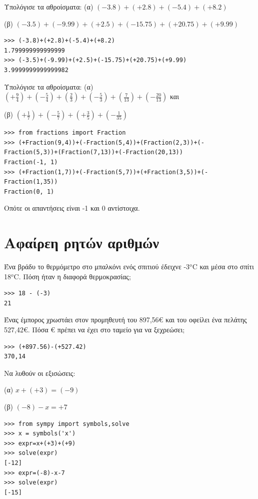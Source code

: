 \begin{exercise}  Υπολόγισε τα αθροίσματα:
(α) $(-3.8)+(+2.8)+(-5.4)+(+8.2)$

(β) $(-3.5)+(-9.99)+(+2.5)+(-15.75)+(+20.75)+(+9.99)$

\end{exercise}
\begin{lstlisting}
>>> (-3.8)+(+2.8)+(-5.4)+(+8.2)
1.799999999999999
>>> (-3.5)+(-9.99)+(+2.5)+(-15.75)+(+20.75)+(+9.99)
3.9999999999999982
\end{lstlisting}

\begin{exercise}
Υπολόγισε τα αθροίσματα:
(α) $\left(+\frac{9}{4}\right)+\left(-\frac{5}{4}\right)+\left(\frac{2}{3}\right)+\left(-\frac{5}{3}\right)+\left(\frac{7}{13}\right)+\left(-\frac{20}{13}\right)$ και 

(β) $\left(+\frac{1}{7}\right)+\left(-\frac{5}{7}\right)+\left(+\frac{3}{5}\right)+\left(-\frac{1}{35}\right)$
\end{exercise}
\begin{lstlisting}
>>> from fractions import Fraction
>>> (+Fraction(9,4))+(-Fraction(5,4))+(Fraction(2,3))+(-Fraction(5,3))+(Fraction(7,13))+(-Fraction(20,13))
Fraction(-1, 1)
>>> (+Fraction(1,7))+(-Fraction(5,7))+(+Fraction(3,5))+(-Fraction(1,35))
Fraction(0, 1)
\end{lstlisting}
Οπότε οι απαντήσεις είναι -1 και 0 αντίστοιχα.
\section{Αφαίρεη ρητών αριθμών}
\begin{exercise}
 Ένα βράδυ το θερμόμετρο στο μπαλκόνι ενός σπιτιού έδειχνε -3$^o$C και μέσα στο σπίτι 18$^o$C. Πόση ήταν η διαφορά θερμοκρασίας;
\end{exercise}
\begin{lstlisting}
>>> 18 - (-3)
21
\end{lstlisting}
\begin{exercise}
Ένας έμπορος χρωστάει στον προμηθευτή του 897,56€ και του οφείλει ένα πελάτης 527,42€. Πόσα € πρέπει να έχει στο ταμείο για να ξεχρεώσει;
\end{exercise}
\begin{lstlisting}
>>> (+897.56)-(+527.42)
370,14
\end{lstlisting}
\begin{exercise}
 Να λυθούν οι εξισώσεις:

(α) $x+(+3)=(-9)$ 

(β) $(-8)-x=+7$
\end{exercise}
\begin{lstlisting}
>>> from sympy import symbols,solve
>>> x = symbols('x')
>>> expr=x+(+3)+(+9)
>>> solve(expr)
[-12]
>>> expr=(-8)-x-7
>>> solve(expr)
[-15]
\end{lstlisting}

